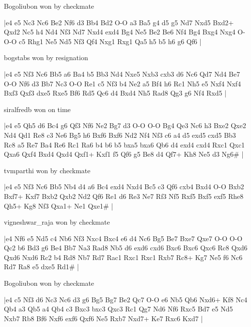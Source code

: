 \showboard

Bogoliubon won by checkmate

\makegametitle
|e4 e5 Nc3 Nc6 Be2 Nf6 d3 Bb4 Bd2 O-O a3 Ba5 g4 d5 g5 Nd7 Nxd5 Bxd2+ Qxd2 Nc5 h4 Nd4 Nf3 Nd7 Nxd4 exd4 Bg4 Ne5 Be2 Be6 Nf4 Bg4 Bxg4 Nxg4 O-O-O c5 Rhg1 Ne5 Nd5 Nf3 Qf4 Nxg1 Rxg1 Qa5 h5 b5 h6 g6 Qf6  |

\showboard

bogstabs won by resignation

\makegametitle
|e4 e5 Nf3 Nc6 Bb5 a6 Ba4 b5 Bb3 Nd4 Nxe5 Nxb3 cxb3 d6 Nc6 Qd7 Nd4 Be7 O-O Nf6 d3 Bb7 Nc3 O-O Re1 c5 Nf3 b4 Ne2 a5 Bf4 h6 Rc1 Nh5 e5 Nxf4 Nxf4 Bxf3 Qxf3 dxe5 Rxe5 Bf6 Rd5 Qc6 d4 Bxd4 Nh5 Rad8 Qg3 g6 Nf4 Rxd5  |

\showboard

siralfredb won on time

\makegametitle
|e4 e5 Qh5 d6 Bc4 g6 Qf3 Nf6 Ne2 Bg7 d3 O-O O-O Bg4 Qe3 Nc6 h3 Bxe2 Qxe2 Nd4 Qd1 Re8 c3 Ne6 Bg5 h6 Bxf6 Bxf6 Nd2 Nf4 Nf3 c6 a4 d5 exd5 cxd5 Bb3 Rc8 a5 Re7 Ba4 Re6 Rc1 Ra6 b4 b6 b5 bxa5 bxa6 Qb6 d4 exd4 cxd4 Rxc1 Qxc1 Qxa6 Qxf4 Bxd4 Qxd4 Qxf1+ Kxf1 f5 Qf6 g5 Be8 d4 Qf7+ Kh8 Ne5 d3 Ng6\#  |

\showboard

tvmparthi won by checkmate

\makegametitle
|e4 e5 Nf3 Nc6 Bb5 Nb4 d4 a6 Bc4 exd4 Nxd4 Bc5 c3 Qf6 cxb4 Bxd4 O-O Bxb2 Bxf7+ Kxf7 Bxb2 Qxb2 Nd2 Qf6 Re1 d6 Re3 Ne7 Rf3 Nf5 Rxf5 Bxf5 exf5 Rhe8 Qh5+ Kg8 Nf3 Qxa1+ Ne1 Qxe1\#  |

\showboard

vigneshwar\_raja won by checkmate

\makegametitle
|e4 Nf6 e5 Nd5 c4 Nb6 Nf3 Nxc4 Bxc4 e6 d4 Nc6 Bg5 Be7 Bxe7 Qxe7 O-O O-O Qc2 b6 Bd3 g6 Be4 Bb7 Na3 Rad8 Nb5 d6 exd6 cxd6 Bxc6 Bxc6 Qxc6 Rc8 Qxd6 Qxd6 Nxd6 Rc2 b4 Rd8 Nb7 Rd7 Rac1 Rxc1 Rxc1 Rxb7 Rc8+ Kg7 Ne5 f6 Nc6 Rd7 Ra8 e5 dxe5 Rd1\#  |

\showboard

Bogoliubon won by checkmate

\makegametitle
|e4 c5 Nf3 d6 Nc3 Nc6 d3 g6 Bg5 Bg7 Be2 Qc7 O-O e6 Nb5 Qb6 Nxd6+ Kf8 Nc4 Qb4 a3 Qb5 a4 Qb4 c3 Bxc3 bxc3 Qxc3 Rc1 Qg7 Nd6 Nf6 Rxc5 Bd7 e5 Nd5 Nxb7 Rb8 Bf6 Nxf6 exf6 Qxf6 Ne5 Rxb7 Nxd7+ Ke7 Rxc6 Kxd7  |

